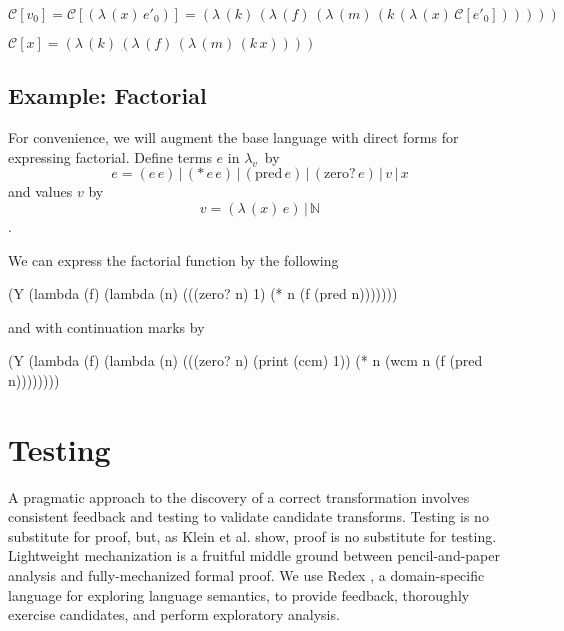 \documentclass{llncs}
\newcommand{\lv}[0]{$\lambda_v$}
\newcommand{\app}[2]{(#1\,#2)}
\newcommand{\abs}[2]{(\lambda\,(#1)\,#2)}
\newcommand{\C}[1]{\mathcal{C}[#1]}
\begin{document}
\begin{defn}
$\C{v_0}=\C{\abs{x}{e'_0}}=\abs{k}{\abs{f}{\abs{m}{\app{k}{\abs{x}{\C{e'_0}}}}}}$
\end{defn}

\begin{defn}
$\C{x}=\abs{k}{\abs{f}{\abs{m}{\app{k}{x}}}}$
\end{defn}

\subsection{Example: Factorial}

For convenience, we will augment the base language with direct forms for expressing factorial. Define terms $e$ in \lv\ by
\begin{equation}
e=\app{e}{e}\,|\,(*\,e\,e)\,|\,\app{\mathrm{pred}}{e}\,|\,\app{\mathrm{zero?}}{e}\,|\,v\,|\,x
\end{equation}
and values $v$ by
\begin{equation}
v=\abs{x}{e}\,|\,\mathbb{N}
\end{equation}
.

We can express the factorial function by the following
\begin{schemedisplay}
(Y (lambda (f)
     (lambda (n)
       (((zero? n)
         1)
        (* n (f (pred n)))))))
\end{schemedisplay}

and with continuation marks by
\begin{schemedisplay}
(Y (lambda (f)
     (lambda (n)
       (((zero? n)
         (print (ccm) 1))
        (* n (wcm n (f (pred n))))))))
\end{schemedisplay}

\section{Testing}

A pragmatic approach to the discovery of a correct transformation involves consistent feedback and testing to validate candidate transforms. Testing is no substitute for proof, but, as Klein et al. \cite{klein2012run} show, proof is no substitute for testing. Lightweight mechanization is a fruitful middle ground between pencil-and-paper analysis and fully-mechanized formal proof. We use Redex \cite{findler2010redex}, a domain-specific language for exploring language semantics, to provide feedback, thoroughly exercise candidates, and perform exploratory analysis.
\end{document}

